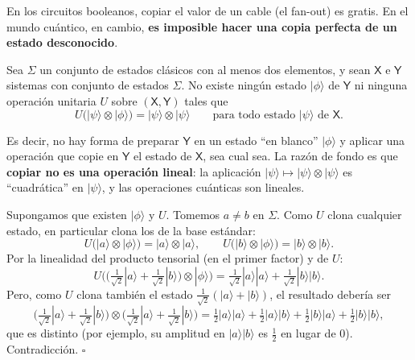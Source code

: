\documentclass[11pt, a4paper, twoside, openright]{report}
\begin{document}
\noindent En los circuitos booleanos, copiar el valor de un cable (el fan-out) es gratis. En el mundo cuántico, en cambio, \textbf{es imposible hacer una copia perfecta de un estado desconocido}.

\begin{tcolorbox}[colback=teal!5!white,colframe=teal!75!black,title=\textbf{Teorema de no clonación}]
Sea $\Sigma$ un conjunto de estados clásicos con al menos dos elementos, y sean $\mathsf{X}$ e $\mathsf{Y}$ sistemas con conjunto de estados $\Sigma$. No existe ningún estado $|\phi\rangle$ de $\mathsf{Y}$ ni ninguna operación unitaria $U$ sobre $(\mathsf{X},\mathsf{Y})$ tales que
\[ U\big(|\psi\rangle\otimes|\phi\rangle\big) = |\psi\rangle\otimes|\psi\rangle \qquad \text{para todo estado } |\psi\rangle \text{ de } \mathsf{X}. \]
\end{tcolorbox}

\noindent Es decir, no hay forma de preparar $\mathsf{Y}$ en un estado ``en blanco'' $|\phi\rangle$ y aplicar una operación que copie en $\mathsf{Y}$ el estado de $\mathsf{X}$, sea cual sea. La razón de fondo es que \textbf{copiar no es una operación lineal}: la aplicación $|\psi\rangle\mapsto|\psi\rangle\otimes|\psi\rangle$ es ``cuadrática'' en $|\psi\rangle$, y las operaciones cuánticas son lineales.

\begin{tcolorbox}[colback=gray!5!white,colframe=gray!75!black,title=\textbf{Demostración (por linealidad)}]
Supongamos que existen $|\phi\rangle$ y $U$. Tomemos $a\neq b$ en $\Sigma$. Como $U$ clona cualquier estado, en particular clona los de la base estándar:
\[ U\big(|a\rangle\otimes|\phi\rangle\big) = |a\rangle\otimes|a\rangle, \qquad U\big(|b\rangle\otimes|\phi\rangle\big) = |b\rangle\otimes|b\rangle. \]
Por la linealidad del producto tensorial (en el primer factor) y de $U$:
\[ U\Big(\big(\tfrac{1}{\sqrt2}|a\rangle + \tfrac{1}{\sqrt2}|b\rangle\big)\otimes|\phi\rangle\Big) = \tfrac{1}{\sqrt2}|a\rangle|a\rangle + \tfrac{1}{\sqrt2}|b\rangle|b\rangle. \]
Pero, como $U$ clona también el estado $\frac{1}{\sqrt2}(|a\rangle + |b\rangle)$, el resultado debería ser
\[ \big(\tfrac{1}{\sqrt2}|a\rangle + \tfrac{1}{\sqrt2}|b\rangle\big)\otimes\big(\tfrac{1}{\sqrt2}|a\rangle + \tfrac{1}{\sqrt2}|b\rangle\big) = \tfrac12|a\rangle|a\rangle + \tfrac12|a\rangle|b\rangle + \tfrac12|b\rangle|a\rangle + \tfrac12|b\rangle|b\rangle, \]
que es distinto (por ejemplo, su amplitud en $|a\rangle|b\rangle$ es $\frac12$ en lugar de $0$). Contradicción. \hfill $\square$
\end{tcolorbox}
\end{document}
